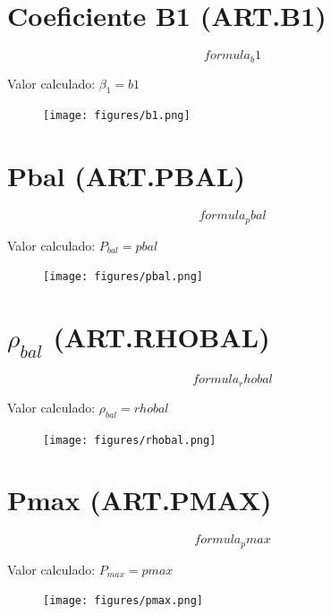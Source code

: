 \documentclass[12pt]{article}
\begin{document}
\section*{Coeficiente B1 (ART.B1)}

\[
{{ formula_b1 }}
\]

Valor calculado: \( \beta_1 = {{ b1 }} \)

\begin{figure}[H]
\centering
\texttt{[image: figures/b1.png]}
\end{figure}

\vspace{0.5cm}

\section*{Pbal (ART.PBAL)}

\[
{{ formula_pbal }}
\]

Valor calculado: \( P_{bal} = {{ pbal }} \)

\begin{figure}[H]
\centering
\texttt{[image: figures/pbal.png]}
\end{figure}

\vspace{0.5cm}

\section*{\ensuremath{\rho_{bal}} (ART.RHOBAL)}

\[
{{ formula_rhobal }}
\]

Valor calculado: \( \rho_{bal} = {{ rhobal }} \)

\begin{figure}[H]
\centering
\texttt{[image: figures/rhobal.png]}
\end{figure}

\vspace{0.5cm}

\section*{Pmax (ART.PMAX)}

\[
{{ formula_pmax }}
\]

Valor calculado: \( P_{max} = {{ pmax }} \)

\begin{figure}[H]
\centering
\texttt{[image: figures/pmax.png]}
\end{figure}
\end{document}
